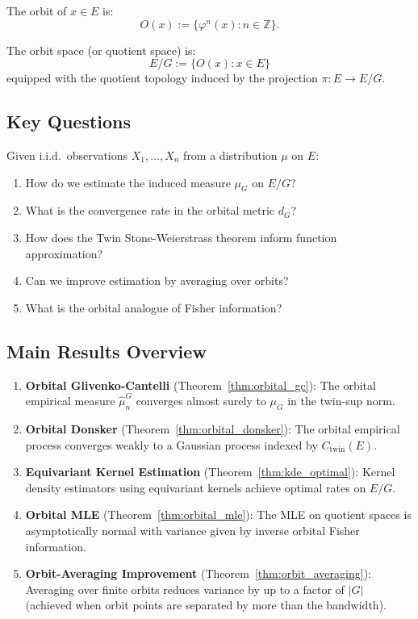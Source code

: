 \documentclass[11pt]{article}
\newcommand{\Z}{\mathbb{Z}}
\begin{document}
The orbit of $x \in E$ is:
\begin{equation}\label{eq:orbit}
O(x) := \{\varphi^n(x) : n \in \Z\}.
\end{equation}

The orbit space (or quotient space) is:
\begin{equation}\label{eq:quotient}
E/G := \{O(x) : x \in E\}
\end{equation}
equipped with the quotient topology induced by the projection $\pi : E \to E/G$.

\subsection{Key Questions}

Given i.i.d.\ observations $X_1, \ldots, X_n$ from a distribution $\mu$ on $E$:
\begin{enumerate}
\item How do we estimate the induced measure $\mu_G$ on $E/G$?
\item What is the convergence rate in the orbital metric $d_G$?
\item How does the Twin Stone-Weierstrass theorem inform function approximation?
\item Can we improve estimation by averaging over orbits?
\item What is the orbital analogue of Fisher information?
\end{enumerate}

\subsection{Main Results Overview}

\begin{enumerate}
\item \textbf{Orbital Glivenko-Cantelli} (Theorem~\ref{thm:orbital_gc}): The orbital empirical measure $\hat{\mu}_n^G$ converges almost surely to $\mu_G$ in the twin-sup norm.

\item \textbf{Orbital Donsker} (Theorem~\ref{thm:orbital_donsker}): The orbital empirical process converges weakly to a Gaussian process indexed by $C_{\mathrm{twin}}(E)$.

\item \textbf{Equivariant Kernel Estimation} (Theorem~\ref{thm:kde_optimal}): Kernel density estimators using equivariant kernels achieve optimal rates on $E/G$.

\item \textbf{Orbital MLE} (Theorem~\ref{thm:orbital_mle}): The MLE on quotient spaces is asymptotically normal with variance given by inverse orbital Fisher information.

\item \textbf{Orbit-Averaging Improvement} (Theorem~\ref{thm:orbit_averaging}): Averaging over finite orbits reduces variance by up to a factor of $|G|$ (achieved when orbit points are separated by more than the bandwidth).
\end{enumerate}
\end{document}
